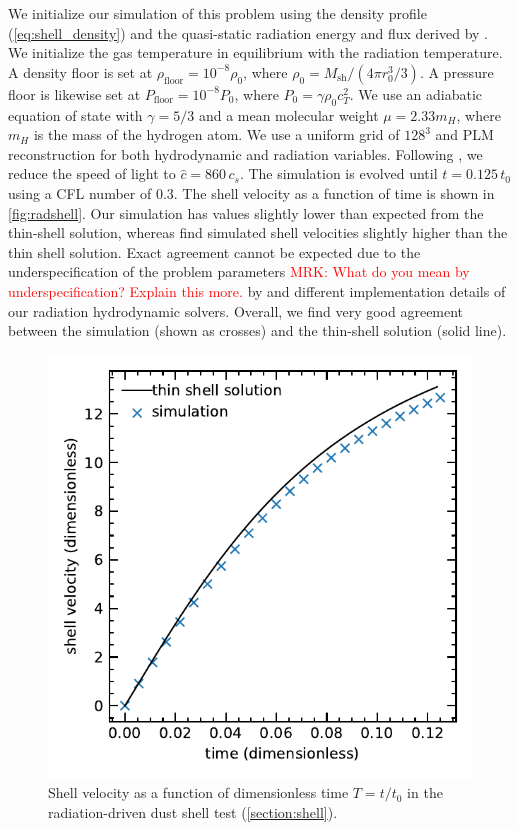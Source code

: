 \documentclass[fleqn,usenatbib]{mnras}
\begin{document}
We initialize our simulation of this problem using the density profile (\autoref{eq:shell_density}) and the quasi-static radiation energy and flux derived by . We initialize the gas temperature in equilibrium with the radiation temperature. A density floor is set at $\rho_{\text{floor}} = 10^{-8} \rho_0$, where $\rho_0 = M_{\text{sh}} / (4 \pi r_0^3 / 3)$. A pressure floor is likewise set at $P_{\text{floor}} = 10^{-8} P_0$, where $P_0 = \gamma \rho_0 c_T^2$. We use an adiabatic equation of state with $\gamma = 5/3$ and a mean molecular weight $\mu = 2.33 m_H$, where $m_H$ is the mass of the hydrogen atom. We use a uniform grid of $128^3$ and PLM reconstruction for both hydrodynamic and radiation variables. Following \citet{Skinner_2013}, we reduce the speed of light to $\hat c = 860 \, c_s$. The simulation is evolved until $t = 0.125 \, t_0$ using a CFL number of $0.3$. The shell velocity as a function of time is shown in \autoref{fig:radshell}. Our simulation has values slightly lower than expected from the thin-shell solution, whereas  find simulated shell velocities slightly higher than the thin shell solution. Exact agreement cannot be expected due to the underspecification of the problem parameters \textcolor{red}{MRK: What do you mean by underspecification? Explain this more.} by  and different implementation details of our radiation hydrodynamic solvers. Overall, we find very good agreement between the simulation (shown as crosses) and the thin-shell solution (solid line). 

\begin{figure}
    \includegraphics[width=\columnwidth]{shell_velocity.pdf}
    \caption{Shell velocity as a function of dimensionless time $T = t/t_0$ in the radiation-driven dust shell test (\autoref{section:shell}).}
    \label{fig:radshell}
\end{figure}
\end{document}
